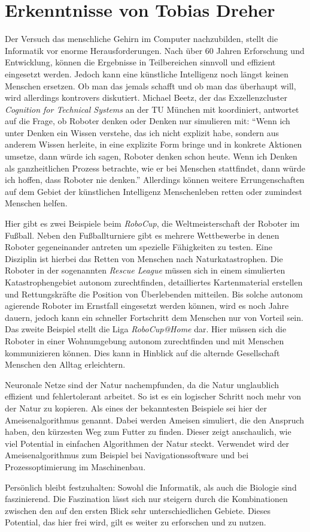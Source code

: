 \section{Erkenntnisse von Tobias Dreher}
Der Versuch das menschliche Gehirn im Computer nachzubilden, stellt die Informatik vor enorme Herausforderungen. Nach über 60 Jahren Erforschung und Entwicklung, können die Ergebnisse in Teilbereichen sinnvoll und effizient eingesetzt werden. Jedoch kann eine künstliche Intelligenz noch längst keinen Menschen ersetzen. Ob man das jemals schafft und ob man das überhaupt will, wird allerdings kontrovers diskutiert. Michael Beetz, der das Exzellenzcluster \emph{Cognition for Technical Systems} an der TU München mit koordiniert, antwortet auf die Frage, ob Roboter denken oder Denken nur simulieren mit: ``Wenn ich unter Denken ein Wissen verstehe, das ich nicht explizit habe, sondern aus anderem Wissen herleite, in eine explizite Form bringe und in konkrete Aktionen umsetze, dann würde ich sagen, Roboter denken schon heute. Wenn ich Denken als ganzheitlichen Prozess betrachte, wie er bei Menschen stattfindet, dann würde ich hoffen, dass Roboter nie denken.'' \cite[S. 75]{bib:ct211} Allerdings können weitere Errungenschaften auf dem Gebiet der künstlichen Intelligenz Menschenleben retten oder zumindest Menschen helfen.

Hier gibt es zwei Beispiele beim \emph{RoboCup}, die Weltmeisterschaft der Roboter im Fußball. Neben den Fußballturniere gibt es mehrere Wettbewerbe in denen Roboter gegeneinander antreten um spezielle Fähigkeiten zu testen. Eine Disziplin ist hierbei das Retten von Menschen nach Naturkatastrophen. Die Roboter in der sogenannten \emph{Rescue League} müssen sich in einem simulierten Katastrophengebiet autonom zurechtfinden, detailliertes Kartenmaterial erstellen und Rettungskräfte die Position von Überlebenden mitteilen. Bis solche autonom agierende Roboter im Ernstfall eingesetzt werden können, wird es noch Jahre dauern, jedoch kann ein schneller Fortschritt dem Menschen nur von Vorteil sein. Das zweite Beispiel stellt die Liga \emph{RoboCup@Home} dar. Hier müssen sich die Roboter in einer Wohnumgebung autonom zurechtfinden und mit Menschen kommunizieren können. Dies kann in Hinblick auf die alternde Gesellschaft Menschen den Alltag erleichtern. \cite[S. 73]{bib:ct711}

Neuronale Netze sind der Natur nachempfunden, da die Natur unglaublich effizient und fehlertolerant arbeitet. So ist es ein logischer Schritt noch mehr von der Natur zu kopieren. Als eines der bekanntesten Beispiele sei hier der Ameisenalgorithmus genannt. Dabei werden Ameisen simuliert, die den Anspruch haben, den kürzesten Weg zum Futter zu finden. Dieser zeigt anschaulich, wie viel Potential in einfachen Algorithmen der Natur steckt. Verwendet wird der Ameisenalgorithmus zum Beispiel bei Navi\-gations\-soft\-ware und bei Prozessoptimierung im Maschinenbau. \cite{bib:ameisen}

Persönlich bleibt festzuhalten: Sowohl die Informatik, als auch die Biologie sind fas\-zi\-nie\-rend.  Die Faszination lässt sich nur steigern durch die Kombinationen zwischen den auf den ersten Blick sehr unterschiedlichen Gebiete. Dieses Potential, das hier frei wird, gilt es weiter zu erforschen und zu nutzen.